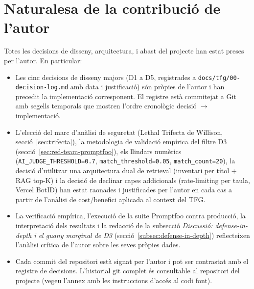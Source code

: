 \section*{Naturalesa de la contribució de l'autor}

Totes les decisions de disseny, arquitectura, i abast del projecte han estat preses per l'autor. En particular:

\begin{itemize}
    \item Les cinc decisions de disseny majors (D1 a D5, registrades a \texttt{docs/tfg/00-decision-log.md} amb data i justificació) són pròpies de l'autor i han precedit la implementació corresponent. El registre està commitejat a Git amb segells temporals que mostren l'ordre cronològic decisió $\rightarrow$ implementació.
    \item L'elecció del marc d'anàlisi de seguretat (Lethal Trifecta de Willison, secció~\ref{sec:trifecta}), la metodologia de validació empírica del filtre D3 (secció~\ref{sec:red-team-promptfoo}), els llindars numèrics (\texttt{AI\_JUDGE\_THRESHOLD=0.7}, \texttt{match\_threshold=0.05}, \texttt{match\_count=20}), la decisió d'utilitzar una arquitectura dual de retrieval (inventari per títol + RAG top-K) i la decisió de declinar capes addicionals (rate-limiting per taula, Vercel BotID) han estat raonades i justificades per l'autor en cada cas a partir de l'anàlisi de cost/benefici aplicada al context del TFG.
    \item La verificació empírica, l'execució de la suite Promptfoo contra producció, la interpretació dels resultats i la redacció de la subsecció \emph{Discussió: defense-in-depth i el guany marginal de D3} (secció~\ref{subsec:defense-in-depth}) reflecteixen l'anàlisi crítica de l'autor sobre les seves pròpies dades.
    \item Cada commit del repositori està signat per l'autor i pot ser contrastat amb el registre de decisions. L'historial git complet és consultable al repositori del projecte (vegeu l'annex amb les instruccions d'accés al codi font).
\end{itemize}

\clearpage

